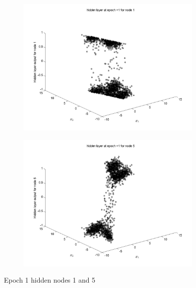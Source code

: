 \documentclass{article}
\begin{document}
\begin{figure}
\begin{subfigure}{.5\textwidth}
  \centering
  \includegraphics[width=.8\linewidth]{Classification/overlapping/h1_1}
 
\end{subfigure}%
\begin{subfigure}{.5\textwidth}
  \centering
  \includegraphics[width=.8\linewidth]{Classification/overlapping/h1_5}
  \end{subfigure}
\caption{Epoch 1 hidden nodes 1 and 5}
\end{figure}
\end{document}
